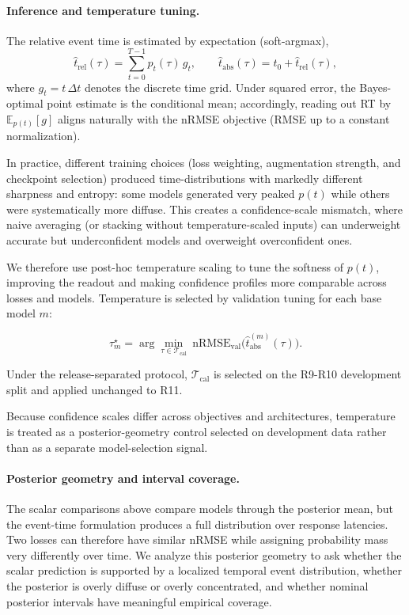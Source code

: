 \documentclass[12pt]{article}
\begin{document}
\paragraph{Inference and temperature tuning.}
The relative event time is estimated by expectation (soft-argmax),
\begin{equation}
\label{eq:rt_soft_argmax}
\hat t_{\mathrm{rel}}(\tau)=\sum_{t=0}^{T-1} p_t(\tau)\, g_t,
\qquad
\hat t_{\mathrm{abs}}(\tau)=t_0+\hat t_{\mathrm{rel}}(\tau),
\end{equation}
where $g_t=t\,\Delta t$ denotes the discrete time grid. Under squared error, the Bayes-optimal point estimate is the
conditional mean; accordingly, reading out RT by $\mathbb{E}_{p(t)}[g]$ aligns naturally with the nRMSE objective (RMSE
up to a constant normalization).

In practice, different training choices (loss weighting, augmentation strength, and checkpoint selection) produced
time-distributions with markedly different sharpness and entropy: some models generated very peaked $p(t)$ while others
were systematically more diffuse. This creates a confidence-scale mismatch, where naive averaging (or stacking without
temperature-scaled inputs) can underweight accurate but underconfident models and overweight overconfident ones.

We therefore use post-hoc temperature scaling \citep{guo2017calibration} to tune the softness of $p(t)$, improving the
readout and making confidence profiles more comparable across losses and models.
Temperature is selected by validation tuning for each base model $m$:

\begin{equation}
\label{eq:rt_tau_tuning}
\tau_m^\star = \arg\min_{\tau\in\mathcal{T}_{\text{cal}}}
\ \mathrm{nRMSE}_{\text{val}}\big(\hat t_{\mathrm{abs}}^{(m)}(\tau)\big).
\end{equation}

Under the release-separated protocol, $\mathcal{T}_{\text{cal}}$ is selected on the R9-R10 development split and applied unchanged to R11.

Because confidence scales differ across objectives and architectures, temperature is treated as a posterior-geometry
control selected on development data rather than as a separate model-selection signal.

\paragraph{Posterior geometry and interval coverage.}
The scalar comparisons above compare models through the posterior mean, but the event-time formulation produces a full distribution over response latencies. Two losses can therefore have similar nRMSE while assigning probability mass very differently over time. We analyze this posterior geometry to ask whether the scalar prediction is supported by a localized temporal event distribution, whether the posterior is overly diffuse or overly concentrated, and whether nominal posterior intervals have meaningful empirical coverage.
\end{document}
